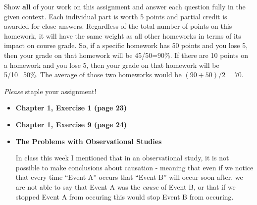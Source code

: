 \documentclass[11pt]{article}\usepackage[]{graphicx}\usepackage[]{color}
\begin{document}
\pagestyle{fancy} 

Show \textbf{all} of your work on this assignment and answer each question fully in the given context. 
Each individual part is worth 5 points and partial credit is awarded for close answers. 
Regardless of the total number of points on this homework, it will have the same weight as all other homeworks in terms of its impact on course grade. 
So, if a specific homework has 50 points and you lose 5, then your grade on that homework will be 45/50=90\%.
If there are 10 points on a homework and you lose 5, then your grade on that homework will be 5/10=50\%.
The average of those two homeworks would be $(90 + 50)/2 = 70$.

\emph{Please} staple your assignment!

\begin{itemize}

\item \textbf{Chapter 1, Exercise 1 (page 23)} \\

\item \textbf{Chapter 1, Exercise 9 (page 24)}

\item \textbf{The Problems with Observational Studies}

In class this week I mentioned that in an observational study, 
it is not possible to make conclusions about causation - meaning that even if we notice that every time ``Event A'' occurs that ``Event B'' will occur soon after, we are not able to say that Event A was the \emph{cause} of Event B, or that if we stopped Event A from occuring this would stop Event B from occuring.


\end{itemize}
\end{document}
